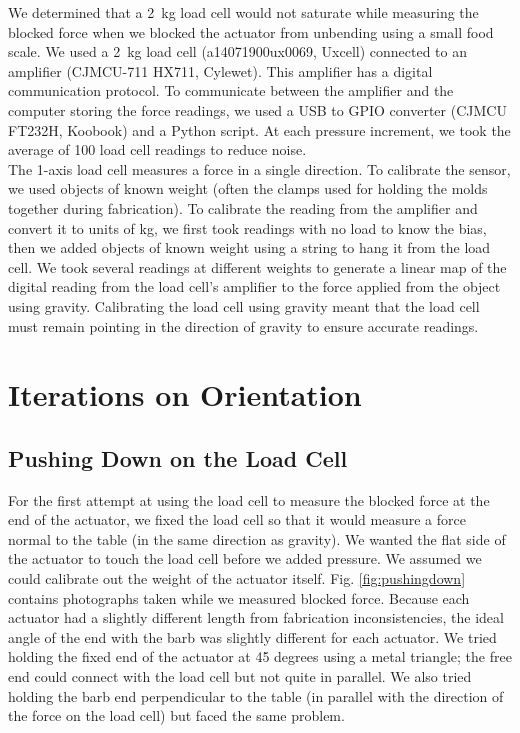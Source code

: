 We determined that a 2~kg load cell would not saturate while measuring the blocked force when we blocked the actuator from unbending using a small food scale. We used a 2~kg load cell (a14071900ux0069, Uxcell) connected to an amplifier (CJMCU-711 HX711, Cylewet). This amplifier has a digital communication protocol. To communicate between the amplifier and the computer storing the force readings, we used a USB to GPIO converter (CJMCU FT232H, Koobook) and a Python script. At each pressure increment, we took the average of 100 load cell readings to reduce noise. \\

The 1-axis load cell measures a force in a single direction. To calibrate the sensor, we used objects of known weight (often the clamps used for holding the molds together during fabrication). To calibrate the reading from the amplifier and convert it to units of kg, we first took readings with no load to know the bias, then we added objects of known weight using a string to hang it from the load cell. We took several readings at different weights to generate a linear map of the digital reading from the load cell's amplifier to the force applied from the object using gravity. Calibrating the load cell using gravity meant that the load cell must remain pointing in the direction of gravity to ensure accurate readings. 

\section{Iterations on Orientation}

\subsection{Pushing Down on the Load Cell}

For the first attempt at using the load cell to measure the blocked force at the end of the actuator, we fixed the load cell so that it would measure a force normal to the table (in the same direction as gravity). We wanted the flat side of the actuator to touch the load cell before we added pressure. We assumed we could calibrate out the weight of the actuator itself. Fig. \ref{fig:pushingdown} contains photographs taken while we measured blocked force. Because each actuator had a slightly different length from fabrication inconsistencies, the ideal angle of the end with the barb was slightly different for each actuator. We tried holding the fixed end of the actuator at 45 degrees using a metal triangle; the free end could connect with the load cell but not quite in parallel. We also tried holding the barb end perpendicular to the table (in parallel with the direction of the force on the load cell) but faced the same problem. 


